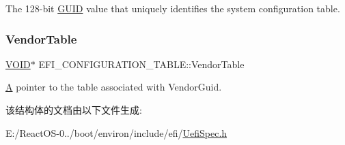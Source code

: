 The 128-\/bit \hyperlink{interface_g_u_i_d}{G\+U\+ID} value that uniquely identifies the system configuration table. \mbox{\label{struct_e_f_i___c_o_n_f_i_g_u_r_a_t_i_o_n___t_a_b_l_e_a1acfe9c046bb4d3a1e7d0e3c7c06f11b}} 
\subsubsection{\texorpdfstring{Vendor\+Table}{VendorTable}}
{\footnotesize\ttfamily \hyperlink{interfacevoid}{V\+O\+ID}$\ast$ E\+F\+I\+\_\+\+C\+O\+N\+F\+I\+G\+U\+R\+A\+T\+I\+O\+N\+\_\+\+T\+A\+B\+L\+E\+::\+Vendor\+Table}

\hyperlink{struct_a}{A} pointer to the table associated with Vendor\+Guid. 

该结构体的文档由以下文件生成\+:\begin{DoxyCompactItemize}
\item 
E\+:/\+React\+O\+S-\/0../boot/environ/include/efi/\hyperlink{_uefi_spec_8h}{Uefi\+Spec.\+h}\end{DoxyCompactItemize}
